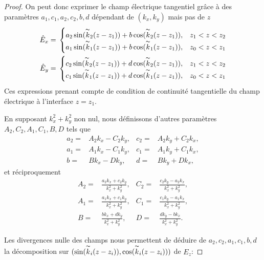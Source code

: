 \begin{proof}
    On peut donc exprimer le champ électrique tangentiel grâce à des paramètres \(a_1,c_1,a_2,c_2,b,d\) dépendant de \((k_x,k_y)\) mais pas de \(z\)
    \begin{align*}
    \hat{E}_x={}& 
    \begin{cases}
    a_2\sin(\overset{\thicksim}{k}_2(z-z_1))+b\cos(\overset{\thicksim}{k}_2(z-z_1)),&  z_1<z<z_2
    \\
    a_1\sin(\overset{\thicksim}{k}_1(z-z_1))+b\cos(\overset{\thicksim}{k}_1(z-z_1)),&  z_0<z<z_1
    \end{cases}
    \\
    \hat{E}_y={}&
    \begin{cases}
    c_2\sin(\overset{\thicksim}{k}_2(z-z_1))+d\cos(\overset{\thicksim}{k}_2(z-z_1)),&   z_1<z<z_2
    \\
    c_1\sin(\overset{\thicksim}{k}_1(z-z_1))+d\cos(\overset{\thicksim}{k}_1(z-z_1)),&   z_0<z<z_1
    \end{cases}
    \end{align*}
    Ces expressions prenant compte de condition de continuité tangentielle du champ électrique à l'interface \(z=z_1\).

    En supposant \(k_x^2 + k_y^2\) non nul, nous définissons d'autres paramètres \(A_2,C_2, A_1, C_1, B, D\) tels que
    \begin{align*}
    a_2 ={}& A_2k_x - C_2k_y, & c_2 ={}& A_2k_y + C_2 k_x,
    \\
    a_1 ={}& A_1k_x - C_1k_y, & c_1 ={}& A_1k_y + C_1 k_x,
    \\
    b ={}& Bk_x - Dk_y, & d ={}& Bk_y + D k_x,
    \end{align*}
    et réciproquement
    \begin{align*}
    A_2 ={}& \frac{a_2 k_x + c_2 k_y}{k_x^2 + k_y^2}, & C_2 ={}& \frac{c_2 k_y - a_2 k_x}{k_x^2 + k_y^2},
    \\
    A_1 ={}& \frac{a_1 k_x + c_1 k_y}{k_x^2 + k_y^2}, & C_1 ={}& \frac{c_1 k_y - a_1 k_x}{k_x^2 + k_y^2},
    \\
    B ={}& \frac{b k_x + d k_y}{k_x^2 + k_y^2}, & D ={}& \frac{d k_y - b k_x}{k_x^2 + k_y^2}.
    \end{align*}

    Les divergences nulle des champs nous permettent de déduire de \(a_2,c_2,a_1,c_1,b,d\) la décomposition sur \((\sin(\overset{\thicksim}{k}_i(z-z_i)),\cos(\overset{\thicksim}{k}_i(z-z_i)))\) de \(E_z\):


\end{proof}
